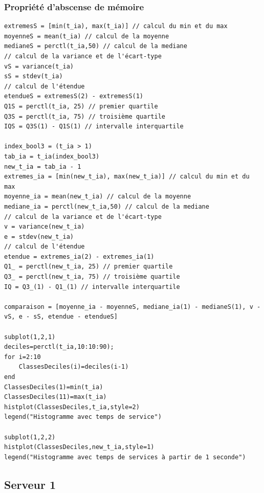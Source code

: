 \documentclass{article}
\begin{document}
\subsubsection{Propriété d'abscense de mémoire}
\begin{verbatim}
extremesS = [min(t_ia), max(t_ia)] // calcul du min et du max
moyenneS = mean(t_ia) // calcul de la moyenne
medianeS = perctl(t_ia,50) // calcul de la mediane
// calcul de la variance et de l'écart-type
vS = variance(t_ia)
sS = stdev(t_ia)
// calcul de l'étendue
etendueS = extremesS(2) - extremesS(1)
Q1S = perctl(t_ia, 25) // premier quartile
Q3S = perctl(t_ia, 75) // troisième quartile
IQS = Q3S(1) - Q1S(1) // intervalle interquartile

index_bool3 = (t_ia > 1)
tab_ia = t_ia(index_bool3)
new_t_ia = tab_ia - 1
extremes_ia = [min(new_t_ia), max(new_t_ia)] // calcul du min et du max
moyenne_ia = mean(new_t_ia) // calcul de la moyenne
mediane_ia = perctl(new_t_ia,50) // calcul de la mediane
// calcul de la variance et de l'écart-type
v = variance(new_t_ia)
e = stdev(new_t_ia)
// calcul de l'étendue
etendue = extremes_ia(2) - extremes_ia(1)
Q1_ = perctl(new_t_ia, 25) // premier quartile
Q3_ = perctl(new_t_ia, 75) // troisième quartile
IQ = Q3_(1) - Q1_(1) // intervalle interquartile

comparaison = [moyenne_ia - moyenneS, mediane_ia(1) - medianeS(1), v - vS, e - sS, etendue - etendueS]

subplot(1,2,1)
deciles=perctl(t_ia,10:10:90);
for i=2:10
    ClassesDeciles(i)=deciles(i-1)
end
ClassesDeciles(1)=min(t_ia)
ClassesDeciles(11)=max(t_ia)
histplot(ClassesDeciles,t_ia,style=2)
legend("Histogramme avec temps de service")

subplot(1,2,2)
histplot(ClassesDeciles,new_t_ia,style=1)
legend("Histogramme avec temps de services à partir de 1 seconde")
\end{verbatim}

\subsection{Serveur 1}
\end{document}
